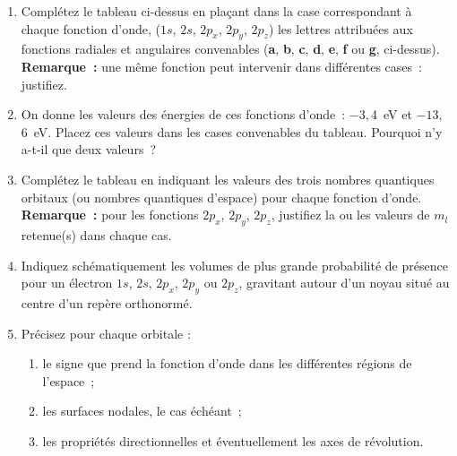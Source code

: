 \begin{enumerate}[\bf 1)]
\item Compl\'etez le tableau ci-dessus en pla\c{c}ant dans la case correspondant \`a chaque fonction d'onde, ($1s$, $2s$, $2p_x$, $2p_y$, $2p_z$) les lettres attribu\'ees aux fonctions radiales et angulaires convenables (\textbf{a}, \textbf{b}, \textbf{c}, \textbf{d}, \textbf{e}, \textbf{f} ou \textbf{g}, ci-dessus).\\

\textbf{Remarque~:} une m\^eme fonction peut intervenir dans diff\'erentes cases~: justifiez.

\item On donne les valeurs des \'energies de ces fonctions d'onde~: $-3,$4~eV et $-13,$6~eV. Placez ces valeurs dans les cases convenables du tableau. Pourquoi n'y a-t-il que deux valeurs~?

\item Compl\'etez le tableau en indiquant les valeurs des trois nombres quantiques orbitaux (ou nombres quantiques d'espace) pour chaque fonction d'onde.\\

\textbf{Remarque~:} pour les fonctions $2p_x$, $2p_y$, $2p_z$, justifiez la ou les valeurs de $m_l$ retenue(s) dans chaque cas.

\item Indiquez sch\'ematiquement les volumes de plus grande probabilit\'e de pr\'esence pour un \'electron $1s$, $2s$, $2p_x$, $2p_y$ ou $2p_z$, gravitant autour d'un noyau situ\'e au centre d'un rep\`ere orthonorm\'e.
\item Pr\'ecisez pour chaque orbitale :
\begin{enumerate}
\item le signe que prend la fonction d'onde dans les diff\'erentes r\'egions de l'espace~;
\item les surfaces nodales, le cas \'ech\'eant~;
\item les propri\'et\'es directionnelles et \'eventuellement les axes de r\'evolution.
\end{enumerate}
\end{enumerate}

